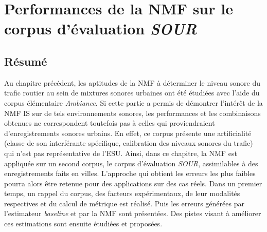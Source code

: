 
\chapter{Performances de la NMF sur le corpus d'évaluation \textit{SOUR}}
\label{chap:grafic}


\section*{\centering Résumé}



\vspace{2cm}

Au chapitre précédent, les aptitudes de la NMF à déterminer le niveau sonore du trafic routier au sein de mixtures sonores urbaines ont été étudiées avec l'aide du corpus élémentaire \textit{Ambiance}. Si cette partie a permis de démontrer l'intérêt de la NMF IS sur de tels environnements sonores, les performances et les combinaisons obtenues ne correspondent toutefois pas à celles qui proviendraient d'enregistrements sonores urbains. En effet, ce corpus présente une artificialité (classe de son interférante spécifique, calibration des niveaux sonores du trafic) qui n'est pas représentative de l'ESU. Ainsi, dans ce chapitre, la NMF est appliquée sur un second corpus, le corpus d'évaluation \textit{SOUR}, assimilables à des enregistrements faits en villes. L'approche qui obtient les erreurs les plus faibles pourra alors être retenue pour des applications sur des cas réels. Dans un premier temps, un rappel du corpus, des facteurs expérimentaux, de leur modalités respectives et du calcul de métrique est réalisé. Puis les erreurs générées par l'estimateur \textit{baseline} et par la NMF sont présentées. Des pistes visant à améliorer ces estimations sont ensuite étudiées et proposées.

